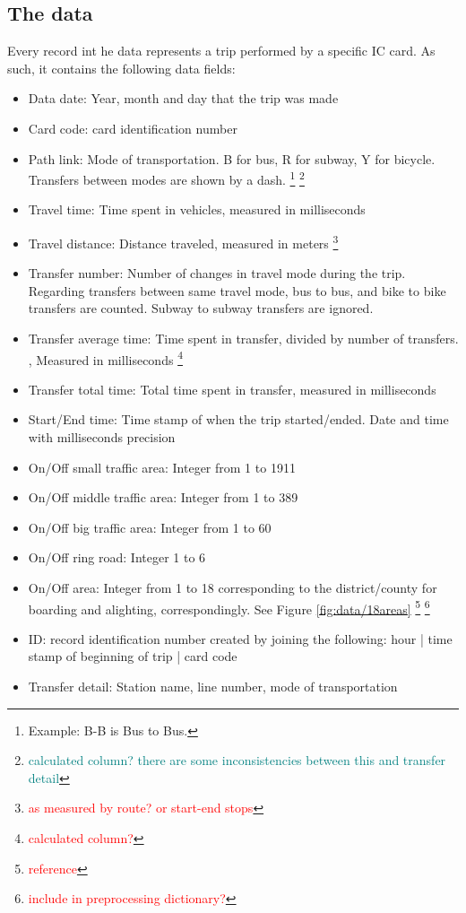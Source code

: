 \documentclass{article}
\newcommand{\selfnote}[1]{\footnote{\textcolor{red}{#1}}}
\newcommand{\domainDoubt}[1]{\footnote{\textcolor{teal}{#1}}}
\begin{document}
\subsection{The data}
\label{sec:data}
Every record int he data represents a trip performed by a specific IC card. As such, it contains the following data fields:

\begin{itemize}
\item Data date: Year, month and day that the trip was made
\item Card code: card identification number
\item Path link: Mode of transportation. B for bus, R for subway, Y for bicycle. Transfers between modes are shown by a dash. \footnote{Example: B-B is Bus to Bus.} \domainDoubt{calculated column? there are some inconsistencies between this and transfer detail}
\item Travel time: Time spent in vehicles, measured in milliseconds
\item Travel distance: Distance traveled, measured in meters \selfnote{as measured by route? or start-end stops}
\item Transfer number: Number of changes in travel mode during the trip. Regarding transfers between same travel mode, bus to bus, and bike to bike transfers are counted. Subway to subway transfers are ignored. 
\item Transfer average time: Time spent in transfer, divided by number of transfers. , Measured in milliseconds \selfnote{calculated column?}
\item Transfer total time: Total time spent in transfer, measured in milliseconds
\item Start/End time: Time stamp of when the trip started/ended. Date and time with milliseconds precision
\item On/Off small traffic area: Integer from 1 to 1911
\item On/Off middle traffic area: Integer from 1 to 389
\item On/Off big traffic area: Integer from 1 to 60
\item On/Off ring road: Integer 1 to 6
\item On/Off area: Integer from 1 to 18 corresponding to the district/county for boarding and alighting, correspondingly. See Figure \ref{fig:data/18areas} \selfnote{reference} \selfnote{include in preprocessing dictionary?} 
\item ID: record identification number created by joining the following: hour | time stamp of beginning of trip | card code
\item Transfer detail: Station name, line number, mode of transportation
\end{itemize}
\end{document}
